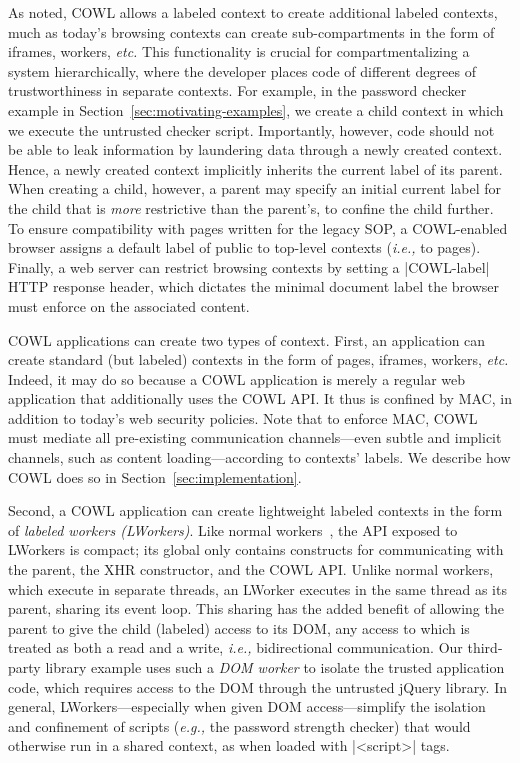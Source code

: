 As noted, COWL allows a labeled context to create additional labeled contexts,
much as today's browsing contexts can create sub-compartments
in the form of iframes, workers, \emph{etc.}
%
This functionality is crucial for compartmentalizing a system
hierarchically, where the developer places code of different degrees
of trustworthiness in separate contexts.
%
For example, in the password checker example in
Section~\ref{sec:motivating-examples}, we create a child context in
which we execute the untrusted checker script.
%
Importantly, however, code should not be able to leak information by
laundering data through a newly created context.
%
Hence, a newly created context implicitly inherits the current label of
its parent.
%
When creating a child, however, a parent may specify an initial
current label for the child that is {\em more} restrictive than the
parent's, to confine the child further.
%
To ensure compatibility with pages written for the legacy SOP, a
COWL-enabled browser assigns a default label of public to top-level
contexts (\emph{i.e.,} to pages).
%
Finally, a web server can restrict browsing contexts by setting a
\js|COWL-label| HTTP response header, which dictates the minimal
document label the browser must enforce on the associated content.

COWL applications can create two types of context.
%
First, an application can create standard (but labeled) contexts in
the form of pages, iframes, workers, \emph{etc.}
%
Indeed, it may do so because a COWL application is merely a regular
web application that additionally uses the COWL API. It thus is
confined by MAC, in addition to today's web security policies.
%
Note that to enforce MAC, COWL must mediate all pre-existing
communication channels---even subtle and implicit channels, such as
content loading---according to contexts' labels.
%
We describe how COWL does so in Section~\ref{sec:implementation}.

Second, a COWL application can create lightweight labeled contexts in
the form of \emph{labeled workers (LWorkers)}.
%
Like normal workers~\cite{workers}, the API exposed to LWorkers is
compact; its global only contains constructs for communicating with
the parent, the XHR constructor, and the COWL API.
%
Unlike normal workers, which execute in separate threads, an LWorker
executes in the same thread as its parent, sharing its event loop.
%
This sharing has the added benefit of allowing the parent to give the
child (labeled) access to its DOM, any access to which is treated as
both a read and a write, \emph{i.e.,} bidirectional communication.
%
Our third-party library example uses such a \emph{DOM worker} to
isolate the trusted application code, which requires access to the DOM
through the untrusted jQuery library.
%
In general, LWorkers---especially when given DOM access---simplify the
isolation and confinement of scripts (\emph{e.g.,} the password strength
checker) that would otherwise run in a shared context, as when loaded
with \js|<script>| tags.

